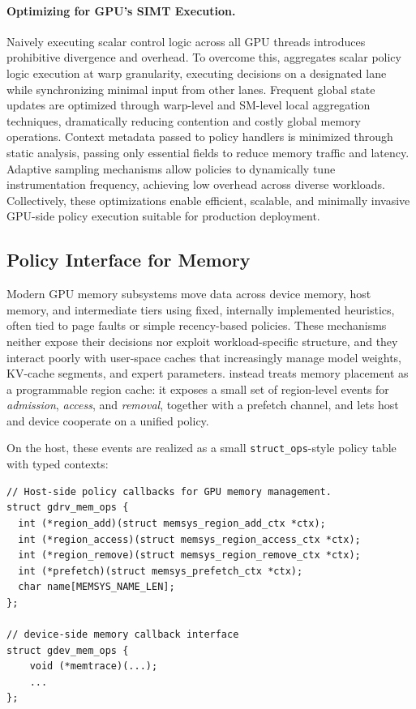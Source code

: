 \paragraph{Optimizing for GPU's SIMT Execution.}
Naively executing scalar control logic across all GPU threads introduces prohibitive divergence and overhead. To overcome this, \sys aggregates scalar policy logic execution at warp granularity, executing decisions on a designated lane while synchronizing minimal input from other lanes. Frequent global state updates are optimized through warp-level and SM-level local aggregation techniques, dramatically reducing contention and costly global memory operations. Context metadata passed to policy handlers is minimized through static analysis, passing only essential fields to reduce memory traffic and latency. Adaptive sampling mechanisms allow policies to dynamically tune instrumentation frequency, achieving low overhead across diverse workloads. Collectively, these optimizations enable efficient, scalable, and minimally invasive GPU-side policy execution suitable for production deployment.

\subsection{Policy Interface for Memory}
\label{sec:design-mem}

Modern GPU memory subsystems move data across device memory, host memory, and
intermediate tiers using fixed, internally implemented heuristics, often tied to
page faults or simple recency-based policies. These mechanisms neither expose their
decisions nor exploit workload-specific structure, and they interact poorly with
user-space caches that increasingly manage model weights, KV-cache segments, and
expert parameters. \sys instead treats memory placement as a programmable region
cache: it exposes a small set of region-level events for \emph{admission},
\emph{access}, and \emph{removal}, together with a prefetch channel, and lets host
and device cooperate on a unified policy.

On the host, these events are realized as a small \texttt{struct\_ops}-style policy
table with typed contexts:

\begin{verbatim}
// Host-side policy callbacks for GPU memory management.
struct gdrv_mem_ops {
  int (*region_add)(struct memsys_region_add_ctx *ctx);
  int (*region_access)(struct memsys_region_access_ctx *ctx);
  int (*region_remove)(struct memsys_region_remove_ctx *ctx);
  int (*prefetch)(struct memsys_prefetch_ctx *ctx);
  char name[MEMSYS_NAME_LEN];
};

// device-side memory callback interface
struct gdev_mem_ops {
    void (*memtrace)(...);
    ...
};
\end{verbatim}

